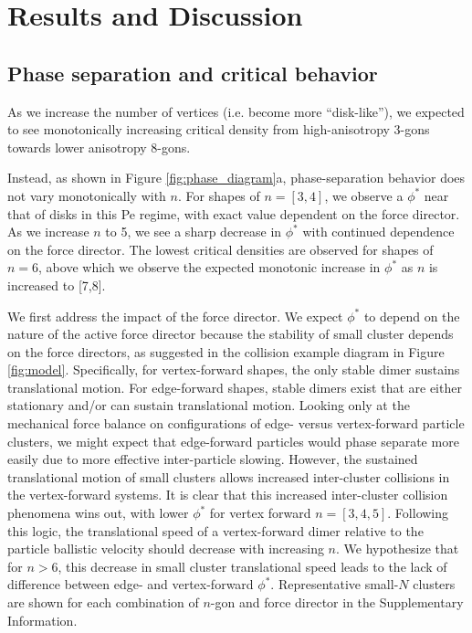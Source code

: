 \section{Results and Discussion}

\subsection{Phase separation and critical behavior}

As we increase the number of vertices (i.e. become more ``disk-like''), we expected to see monotonically increasing critical density\cite{Dijkstra_2019_JChemPhys} from high-anisotropy 3-gons towards lower anisotropy 8-gons.

Instead, as shown in Figure \ref{fig:phase_diagram}a, phase-separation behavior does not vary monotonically with $n$.
For shapes of  $n=[3,4]$, we observe a $\phi^*$ near that of disks in this Pe regime, with exact value dependent on the force director.
As we increase $n$ to 5, we see a sharp decrease in $\phi^*$ with continued dependence on the force director.
The lowest critical densities are observed for shapes of $n=6$, above which we observe the expected monotonic increase in $\phi^*$ as $n$ is increased to [7,8].\cite{anisotropy_comp}

We first address the impact of the force director.
We expect $\phi^*$ to depend on the nature of  the active force director because the stability of small cluster depends on the force directors, as suggested in the collision example diagram in Figure \ref{fig:model}.
Specifically, for vertex-forward shapes, the only stable dimer sustains translational motion.
For edge-forward shapes, stable dimers exist that are either stationary and/or can sustain translational motion.
Looking only at the mechanical force balance on configurations of edge- versus vertex-forward particle clusters, we might expect that edge-forward particles would phase separate more easily due to more effective inter-particle slowing.
However, the sustained translational motion of small clusters allows increased inter-cluster collisions in the vertex-forward systems.
It is clear that this increased inter-cluster collision phenomena wins out, with lower $\phi^*$ for vertex forward $n=[3,4,5]$.
Following this logic, the translational speed of a vertex-forward dimer relative to the particle ballistic velocity should  decrease with increasing $n$.
We hypothesize that for $n>6$, this decrease in small cluster translational speed leads to the lack of difference between edge- and vertex-forward $\phi^*$.
Representative small-$N$ clusters are shown for each combination of $n$-gon and force director in the Supplementary Information.


